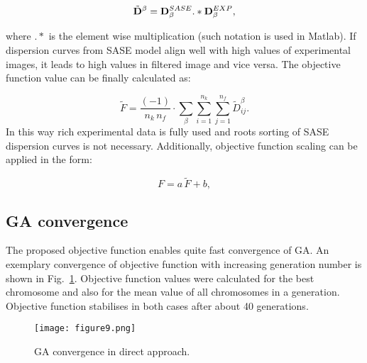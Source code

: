 \begin{equation}
		\tilde{\mathbf{D}}^{\beta} =  \mathbf{D}^{SASE}_{\beta}  .*    \mathbf{D}^{EXP}_{\beta} ,
	\label{eq:objective_fun}\end{equation}

    where \(.*\) is the element wise multiplication (such notation is used in Matlab). If 
    dispersion curves from SASE model align well with high values of experimental 
    images, it leads to high values in filtered image and vice versa.
	The objective function value can be finally calculated as: 
	
\begin{equation}
	\tilde{F} = \frac{(-1)}{n_k \, n_f}  \cdot \sum_{\beta}  \sum_{i=1}^{n_k} \sum_{j=1}^{n_f}	\tilde{D}_{ij}^{\beta}. 
	\end{equation}
	In this way rich experimental data is fully used and roots sorting of SASE dispersion curves is not necessary. Additionally,  objective function scaling can be applied in the form:
	
\begin{equation}
	F = a \,  \tilde{F} + b,
	\end{equation}
\DIFdel{		}\DIFadd{}
\subsection{GA convergence}
The proposed objective function enables quite fast convergence of GA. An exemplary convergence of objective function with increasing generation number is shown in Fig.~\ref{fig:GAconvergence}. Objective function values were calculated for the best chromosome and also for the mean value of all chromosomes in a generation. Objective function stabilises in both cases after about 40 generations.
	
\begin{figure} [h!]
		\centering
	\texttt{[image: figure9.png]}
		
\caption{GA convergence in direct approach.}

		\label{fig:GAconvergence}
	\end{figure}
	
